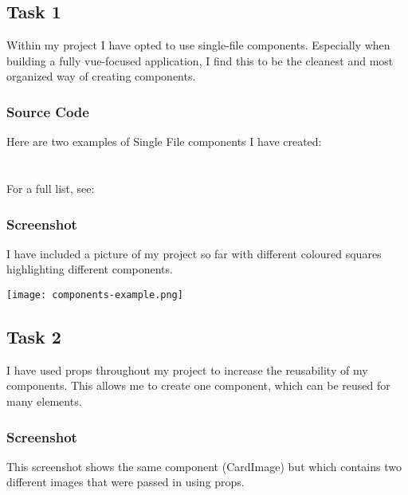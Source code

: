 \documentclass[portfolio.tex]{subfiles}
\begin{document}
		\subsection{Task 1}
			Within my project I have opted to use single-file components. Especially when building a fully vue-focused application, I find this to be the cleanest and most organized way of creating components. \\

		\subsubsection{Source Code}

		Here are two examples of Single File components I have created:\\

		\\

		\\

		For a full list, see:\\
		\subsubsection{Screenshot}
		I have included a picture of my project so far with different coloured squares highlighting different components.

	\begin{center}
		\texttt{[image: components-example.png]}
	\end{center}

	\subsection{Task 2}
		I have used props throughout my project to increase the reusability of my components. This allows me to create one component, which can be reused for many elements.\\

	\subsubsection{Screenshot}
	This screenshot shows the same component (CardImage) but which contains two different images that were passed in using props.
\end{document}
